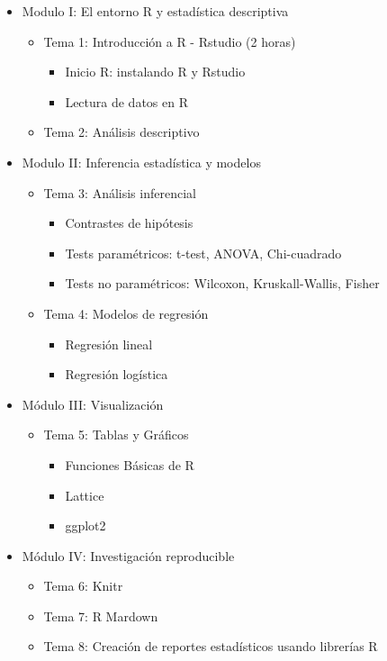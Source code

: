 \documentclass[
]{book}
\providecommand{\tightlist}{%
  \setlength{\itemsep}{0pt}\setlength{\parskip}{0pt}}
\begin{document}
\begin{itemize}
\tightlist
\item
  Modulo I: El entorno R y estadística descriptiva

  \begin{itemize}
  \tightlist
  \item
    Tema 1: Introducción a R - Rstudio (2 horas)

    \begin{itemize}
    \tightlist
    \item
      Inicio R: instalando R y Rstudio
    \item
      Lectura de datos en R
    \end{itemize}
  \item
    Tema 2: Análisis descriptivo
  \end{itemize}
\item
  Modulo II: Inferencia estadística y modelos

  \begin{itemize}
  \tightlist
  \item
    Tema 3: Análisis inferencial

    \begin{itemize}
    \tightlist
    \item
      Contrastes de hipótesis
    \item
      Tests paramétricos: t-test, ANOVA, Chi-cuadrado
    \item
      Tests no paramétricos: Wilcoxon, Kruskall-Wallis, Fisher
    \end{itemize}
  \item
    Tema 4: Modelos de regresión

    \begin{itemize}
    \tightlist
    \item
      Regresión lineal
    \item
      Regresión logística
    \end{itemize}
  \end{itemize}
\item
  Módulo III: Visualización

  \begin{itemize}
  \tightlist
  \item
    Tema 5: Tablas y Gráficos

    \begin{itemize}
    \tightlist
    \item
      Funciones Básicas de R
    \item
      Lattice
    \item
      ggplot2
    \end{itemize}
  \end{itemize}
\item
  Módulo IV: Investigación reproducible

  \begin{itemize}
  \tightlist
  \item
    Tema 6: Knitr
  \item
    Tema 7: R Mardown
  \item
    Tema 8: Creación de reportes estadísticos usando librerías R
  \end{itemize}
\end{itemize}
\end{document}
